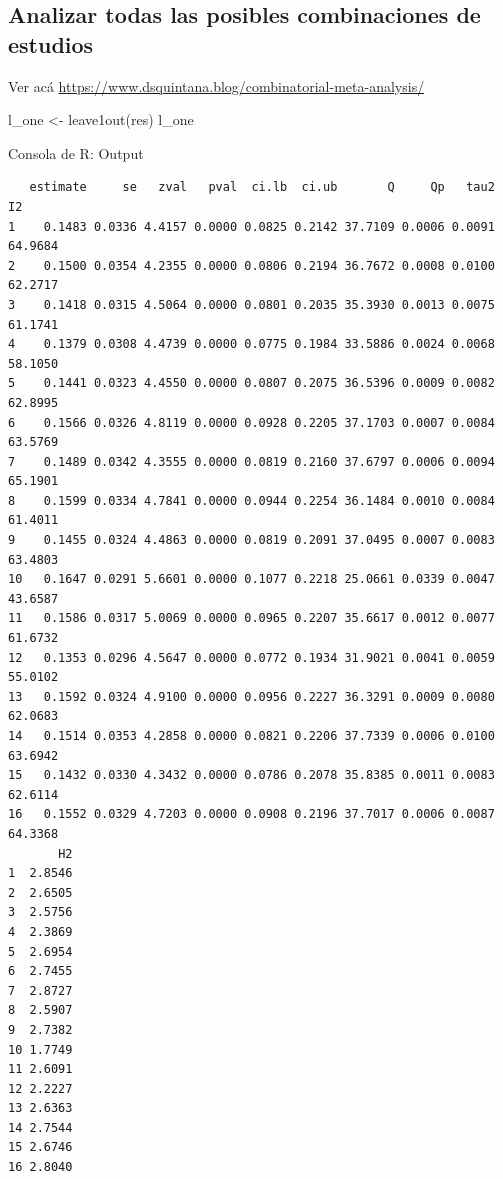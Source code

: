 \documentclass[
  bookmarksnumbered]{article}
\newenvironment{Shaded}{\begin{snugshade}}{\end{snugshade}}
\newcommand{\FunctionTok}[1]{\textcolor[rgb]{0.39,0.29,0.61}{#1}}
\newcommand{\NormalTok}[1]{\textcolor[rgb]{0.12,0.11,0.11}{#1}}
\newcommand{\OtherTok}[1]{\textcolor[rgb]{0.00,0.43,0.16}{#1}}
\begin{document}
\hypertarget{analizar-todas-las-posibles-combinaciones-de-estudios}{%
\subsection{Analizar todas las posibles combinaciones de estudios}\label{analizar-todas-las-posibles-combinaciones-de-estudios}}

Ver acá \url{https://www.dsquintana.blog/combinatorial-meta-analysis/}

\begin{Shaded}
\begin{Highlighting}[]
\NormalTok{l\_one }\OtherTok{\textless{}{-}} \FunctionTok{leave1out}\NormalTok{(res)}
\NormalTok{l\_one}
\end{Highlighting}
\end{Shaded}

\begin{ROut}{Consola de R: Output~\thetcbcounter}
                \begin{footnotesize}
                \begin{verbatim} 
   estimate     se   zval   pval  ci.lb  ci.ub       Q     Qp   tau2      I2 
1    0.1483 0.0336 4.4157 0.0000 0.0825 0.2142 37.7109 0.0006 0.0091 64.9684 
2    0.1500 0.0354 4.2355 0.0000 0.0806 0.2194 36.7672 0.0008 0.0100 62.2717 
3    0.1418 0.0315 4.5064 0.0000 0.0801 0.2035 35.3930 0.0013 0.0075 61.1741 
4    0.1379 0.0308 4.4739 0.0000 0.0775 0.1984 33.5886 0.0024 0.0068 58.1050 
5    0.1441 0.0323 4.4550 0.0000 0.0807 0.2075 36.5396 0.0009 0.0082 62.8995 
6    0.1566 0.0326 4.8119 0.0000 0.0928 0.2205 37.1703 0.0007 0.0084 63.5769 
7    0.1489 0.0342 4.3555 0.0000 0.0819 0.2160 37.6797 0.0006 0.0094 65.1901 
8    0.1599 0.0334 4.7841 0.0000 0.0944 0.2254 36.1484 0.0010 0.0084 61.4011 
9    0.1455 0.0324 4.4863 0.0000 0.0819 0.2091 37.0495 0.0007 0.0083 63.4803 
10   0.1647 0.0291 5.6601 0.0000 0.1077 0.2218 25.0661 0.0339 0.0047 43.6587 
11   0.1586 0.0317 5.0069 0.0000 0.0965 0.2207 35.6617 0.0012 0.0077 61.6732 
12   0.1353 0.0296 4.5647 0.0000 0.0772 0.1934 31.9021 0.0041 0.0059 55.0102 
13   0.1592 0.0324 4.9100 0.0000 0.0956 0.2227 36.3291 0.0009 0.0080 62.0683 
14   0.1514 0.0353 4.2858 0.0000 0.0821 0.2206 37.7339 0.0006 0.0100 63.6942 
15   0.1432 0.0330 4.3432 0.0000 0.0786 0.2078 35.8385 0.0011 0.0083 62.6114 
16   0.1552 0.0329 4.7203 0.0000 0.0908 0.2196 37.7017 0.0006 0.0087 64.3368 
       H2 
1  2.8546 
2  2.6505 
3  2.5756 
4  2.3869 
5  2.6954 
6  2.7455 
7  2.8727 
8  2.5907 
9  2.7382 
10 1.7749 
11 2.6091 
12 2.2227 
13 2.6363 
14 2.7544 
15 2.6746 
16 2.8040 
 \end{verbatim}
                \end{footnotesize}
                \end{ROut}
\end{document}
